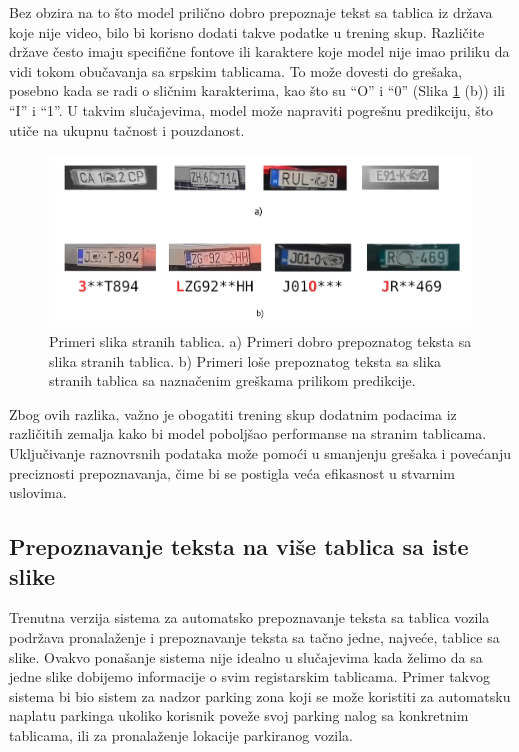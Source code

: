 \documentclass[a4paper,12pt]{article}
\begin{document}
	Bez obzira na to što model prilično dobro prepoznaje tekst sa tablica iz država koje nije video, bilo bi korisno dodati takve podatke u trening skup. Različite države često imaju specifične fontove ili karaktere koje model nije imao priliku da vidi tokom obučavanja sa srpskim tablicama. To može dovesti do grešaka, posebno kada se radi o sličnim karakterima, kao što su \enquote{O} i \enquote{0} (Slika \ref{fig:good-and-bad-predictions} (b)) ili \enquote{I} i \enquote{1}. U takvim slučajevima, model može napraviti pogrešnu predikciju, što utiče na ukupnu tačnost i pouzdanost.
	
	\begin{figure}[H]
		\centering
		\includegraphics[width=\textwidth]{assets/good-and-bad-predictions.png}
		\caption{Primeri slika stranih tablica. a) Primeri dobro prepoznatog teksta sa slika stranih tablica. b) Primeri loše prepoznatog teksta sa slika stranih tablica sa naznačenim greškama prilikom predikcije.}
		\label{fig:good-and-bad-predictions}
	\end{figure}
	
	Zbog ovih razlika, važno je obogatiti trening skup dodatnim podacima iz različitih zemalja kako bi model poboljšao performanse na stranim tablicama. Uključivanje raznovrsnih podataka može pomoći u smanjenju grešaka i povećanju preciznosti prepoznavanja, čime bi se postigla veća efikasnost u stvarnim uslovima.
	
	\subsection{Prepoznavanje teksta na više tablica sa iste slike}
	
	Trenutna verzija sistema za automatsko prepoznavanje teksta sa tablica vozila podržava pronalaženje i prepoznavanje teksta sa tačno jedne, najveće, tablice sa slike. Ovakvo ponašanje sistema nije idealno u slučajevima kada želimo da sa jedne slike dobijemo informacije o svim registarskim tablicama. Primer takvog sistema bi bio sistem za nadzor parking zona koji se može koristiti za automatsku naplatu parkinga ukoliko korisnik poveže svoj parking nalog sa konkretnim tablicama, ili za pronalaženje lokacije parkiranog vozila.
	
\end{document}

